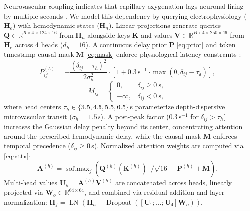 \documentclass[journal]{IEEEtran}
\begin{document}
Neurovascular coupling indicates that capillary oxygenation lags neuronal firing by multiple seconds \cite{buxton1998dynamics, glover1999deconvolution}. We model this dependency by querying electrophysiology ($\mathbf{H}_e$) with hemodynamic states ($\mathbf{H}_n$). Linear projections generate queries $\mathbf{Q} \in \mathbb{R}^{B \times 4 \times 124 \times 16}$ from $\mathbf{H}_n$ alongside keys $\mathbf{K}$ and values $\mathbf{V} \in \mathbb{R}^{B \times 4 \times 250 \times 16}$ from $\mathbf{H}_e$ across 4 heads ($d_h = 16$). A continuous delay prior $\mathbf{P}$ \eqref{eq:prior} and token timestamp causal mask $\mathbf{M}$ \eqref{eq:mask} enforce physiological latency constraints \cite{glover1999deconvolution}:
\begin{equation}
P_{ij}^{(h)} = -\frac{(\delta_{ij} - \tau_h)^2}{2\sigma_h^2} \cdot \left[1 + 0.3\,\mathrm{s}^{-1} \cdot \max(0, \delta_{ij} - \tau_h)\right],
\label{eq:prior}
\end{equation}
\begin{equation}
M_{ij} = \begin{cases}
0, & \delta_{ij} \ge 0\ \mathrm{s}, \\
-\infty, & \delta_{ij} < 0\ \mathrm{s},
\end{cases}
\label{eq:mask}
\end{equation}
where head centers $\tau_h \in \{3.5, 4.5, 5.5, 6.5\}$\,s parameterize depth-dispersive microvascular transit ($\sigma_h = 1.5$\,s). A post-peak factor ($0.3\,\mathrm{s}^{-1}$ for $\delta_{ij} > \tau_h$) increases the Gaussian delay penalty beyond its center, concentrating attention around the prescribed hemodynamic delay, while the causal mask $\mathbf{M}$ enforces temporal precedence ($\delta_{ij} \ge 0$\,s). Normalized attention weights are computed via \eqref{eq:attn}:
\begin{equation}
\mathbf{A}^{(h)} = \operatorname{softmax}_{j}\left(\mathbf{Q}^{(h)}(\mathbf{K}^{(h)})^{\top}/\sqrt{16} + \mathbf{P}^{(h)} + \mathbf{M}\right).
\label{eq:attn}
\end{equation}
Multi-head values $\mathbf{U}_h = \mathbf{A}^{(h)}\mathbf{V}^{(h)}$ are concatenated across heads, linearly projected via $\mathbf{W}_o \in \mathbb{R}^{64 \times 64}$, and combined via residual addition and layer normalization: $\mathbf{H}_f = \operatorname{LN}(\mathbf{H}_n + \operatorname{Dropout}([\mathbf{U}_1; \dots; \mathbf{U}_4]\mathbf{W}_o))$.
\end{document}
